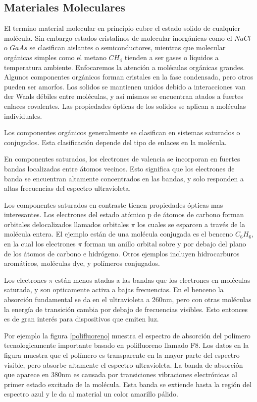 \documentclass[a4paper,openright,12pt]{book}
\begin{document}
\subsection{Materiales Moleculares}
El termino material molecular en principio cubre el estado solido de cualquier molécula. Sin embargo estados cristalinos de molecular inorgánicas como el $NaCl$ o $GaAs$ se clasifican aislantes o semiconductores, mientras que molecular orgánicas simples como el metano $CH_{4}$ tienden a ser gases o líquidos a temperatura ambiente. Enfocaremos la atención a moléculas orgánicas grandes.
Algunos componentes orgánicos forman cristales en la fase condensada, pero otros pueden ser amorfos. Los solidos se mantienen unidos debido a interacciones van der Waals débiles entre moléculas, y así mismos se encuentran atados a fuertes enlaces covalentes. Las propiedades ópticas de los solidos se aplican a moléculas individuales.

Los componentes orgánicos generalmente se clasifican en sistemas saturados o conjugados. Esta clasificación depende del tipo de enlaces en la molécula.

En componentes saturados, los electrones de valencia se incorporan en fuertes bandas localizadas entre átomos vecinos. Esto significa que los electrones de banda se encuentran altamente concentrados en las bandas, y solo responden a altas frecuencias del espectro ultravioleta. 

Los componentes saturados en contraste tienen propiedades ópticas mas interesantes. Los electrones del estado atómico p de átomos de carbono forman orbitales delocalizados llamados orbitales $\pi$ los cuales se esparcen a través de la molécula entera. El ejemplo están de una molécula conjugada es el benceno $C_{6}H_{6}$, en la cual los electrones $\pi$ forman un anillo orbital sobre y por debajo del plano de los átomos de carbono e hidrógeno. Otros ejemplos incluyen hidrocarburos aromáticos, moléculas dye, y polímeros conjugados.

Los electrones $\pi$ están menos atadas a las bandas que los electrones en moléculas saturada, y son opticamente activa a bajas frecuencias. En el benceno la absorción fundamental se da en el ultravioleta a 260nm, pero con otras moléculas la energía de transición cambia por debajo de frecuencias visibles. Esto entonces es de gran interés para dispositivos que emiten luz.

Por ejemplo la figura \ref{polifluoreno} muestra el espectro de absorción del polímero tecnologicamente importante basado en polifluoreno llamado F8. Los datos en la figura muestra que el polímero es transparente en la mayor parte del espectro visible, pero absorbe altamente el espectro ultravioleta. La banda de absorción que aparece en 380nm es causada por transiciones vibraciones electrónicas al primer estado excitado de la molécula. Esta banda se extiende hasta la región del espectro azul y le da al material un color amarillo pálido.
\end{document}
